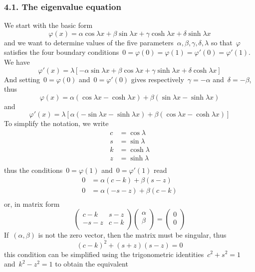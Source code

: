 \subsubsection{4.1. The eigenvalue equation}
We start with the basic form
$$
\varphi(x)=
\alpha\cos\lambda x
+\beta\sin\lambda x
+\gamma\cosh\lambda x
+\delta\sinh\lambda x
$$
and we want to determine values of the five
parameters~$\alpha,\beta,\gamma,\delta,\lambda$ so that~$\varphi$ satisfies
the four boundary conditions~$0=\varphi(0)=\varphi(1)=\varphi'(0)=\varphi'(1)$.
We have
$$
\varphi'(x)=\lambda\left[
	-\alpha\sin\lambda x
	+\beta\cos\lambda x
	+\gamma\sinh\lambda x
	+\delta\cosh\lambda x
\right]
$$
And setting~$0=\varphi(0)$ and~$0=\varphi'(0)$ gives
respectively~$\gamma=-\alpha$ and~$\delta=-\beta$, thus
$$
\varphi(x)=
	\alpha\left(\cos\lambda x-\cosh\lambda x\right)
	+
	\beta\left(\sin\lambda x-\sinh\lambda x\right)
$$
and
$$
\varphi'(x)=\lambda
\left[
	\alpha\left(-\sin\lambda x-\sinh\lambda x\right)
	+
	\beta\left(\cos\lambda x-\cosh\lambda x\right)
	\right]
$$
To simplify the notation, we write
\begin{eqnarray*}
	c &= \cos\lambda \\
	s &= \sin\lambda \\
	k &= \cosh\lambda \\
	z &= \sinh\lambda \\
\end{eqnarray*}
thus the conditions~$0=\varphi(1)$ and~$0=\varphi'(1)$ read
\begin{eqnarray*}
	0 &= \alpha(c-k)+\beta(s-z) \\
	0 &= \alpha(-s-z)+\beta(c-k) \\
\end{eqnarray*}
or, in matrix form
$$
\begin{pmatrix}
	c-k & s-z \\
	-s-z & c-k \\
\end{pmatrix}
\begin{pmatrix}
	\alpha \\
	\beta \\
\end{pmatrix}
=
\begin{pmatrix}
	0 \\
	0 \\
\end{pmatrix}
$$
If~$(\alpha,\beta)$ is not the zero vector, then the matrix must be singular,
thus
$$
(c-k)^2+(s+z)(s-z)=0
$$
this condition can be simplified using the trigonometric
identities~$c^2+s^2=1$ and~$k^2-z^2=1$ to obtain the equivalent
